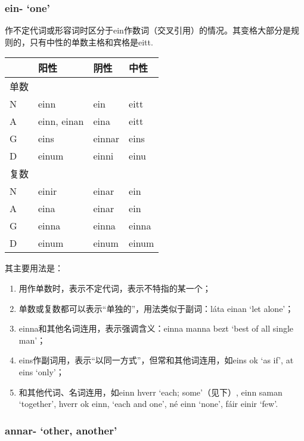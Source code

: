 \begin{introduction}[章节要点]
\subsubsection{ein- `one‌'}
作不定代词或形容词时区分于ein作数词（交叉引用）的情况。其变格大部分是规则的，只有中性的单数主格和宾格是eitt.

\begin{longtable}{llll}
    \toprule
         & 阳性        & 阴性   & 中性  \\
    \midrule
    \endhead
    \bottomrule
    \endfoot
    单数 &             &        &       \\
    N    & einn        & ein    & eitt  \\
    A    & einn, einan & eina   & eitt  \\
    G    & eins        & einnar & eins  \\
    D    & einum       & einni  & einu  \\
    复数 &             &        &       \\
    N    & einir       & einar  & ein   \\
    A    & eina        & einar  & ein   \\
    G    & einna       & einna  & einna \\
    D    & einum       & einum  & einum \\
\end{longtable}

其主要用法是：

\begin{enumerate}
    \item
          用作单数时，表示不定代词，表示不特指的某一个；
    \item
          单数或复数都可以表示``单独的''，用法类似于副词：láta einan `let
          alone'；
    \item
          einna和其他名词连用，表示强调含义：einna manna bezt `best of all
          single man'；
    \item
          eins作副词用，表示``以同一方式''，但常和其他词连用，如eins ok `as if',
          at eins `only'；
    \item
          和其他代词、名词连用，如einn hverr `each; some‌'（见下）, einn saman
          `together', hverr ok einn, `each and one', né einn `none', fáir einir
          `few'.
\end{enumerate}

\subsubsection{annar- `other‌, another'}


\end{introduction}
